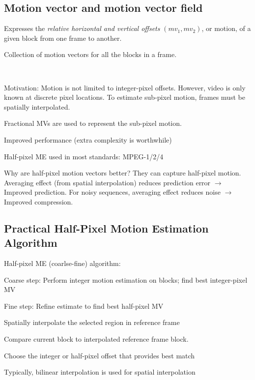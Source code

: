 \begin{compactdesc}
\section{Motion vector and motion vector field}
	\item[\lp{Motion vector}] Expresses the \emph{relative horizontal and vertical offsets} $(mv_1,mv_2)$, or motion, of a given block from one frame to another.
	\item[\lp{Motion vector field}] Collection of motion vectors for all the blocks in a frame.
	\item[\lp{Example of fast motion estimation search}]
\item[\lp{Motion Vector Presision}]\hfill\\
\begin{itemize*}[label=\colorbullet]
	\item Motivation: Motion is not limited to integer-pixel offsets. However, video is only known at discrete pixel locations. To estimate sub-pixel motion, frames must be spatially interpolated.\\
	\item Fractional MVs are used to represent the sub-pixel motion.\\
	\item Improved performance (extra complexity is worthwhile)\\
	\item Half-pixel ME used in most standards: MPEG-1/2/4\\
	\item Why are half-pixel motion vectors better? They can capture half-pixel motion. Averaging effect (from spatial interpolation) reduces prediction error $\to$ Improved prediction. For noisy sequences, averaging effect reduces noise $\to$ Improved compression.
\end{itemize*}
\subsection{Practical Half-Pixel Motion Estimation Algorithm}
Half-pixel ME (coarlse-fine) algorithm:
\begin{enumerate*}[label=\protect\circled{\arabic*},itemjoin=]
	\item Coarse step: Perform integer motion estimation on blocks; find best integer-pixel MV\\
	\item Fine step: Refine estimate to find best half-pixel MV\\
		\begin{enumerate*}[label=\protect\circled{\alph*},itemjoin=]
			\item Spatially interpolate the selected region in reference frame\\
			\item Compare current block to interpolated reference frame block.\\
			\item Choose the integer or half-pixel offset that provides best match
		\end{enumerate*}
\end{enumerate*}
Typically, bilinear interpolation is used for spatial interpolation

\end{compactdesc}
